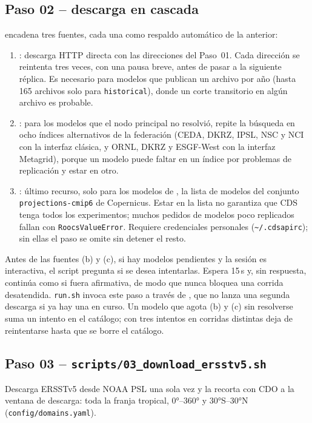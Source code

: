 \subsection{Paso 02 -- descarga en cascada}
 encadena tres fuentes, cada una como respaldo automático de la anterior:
\begin{enumerate}[label=(\alph*)]
\item {}: descarga HTTP directa con las direcciones del Paso~01. Cada dirección se reintenta tres veces, con una pausa breve, antes de pasar a la siguiente réplica. Es necesario para modelos que publican un archivo por año (hasta 165 archivos solo para \texttt{historical}), donde un corte transitorio en algún archivo es probable.
\item {}: para los modelos que el nodo principal no resolvió, repite la búsqueda en ocho índices alternativos de la federación (CEDA, DKRZ, IPSL, NSC y NCI con la interfaz clásica, y ORNL, DKRZ y ESGF-West con la interfaz Metagrid), porque un modelo puede faltar en un índice por problemas de replicación y estar en otro.
\item {}: último recurso, solo para los modelos de , la lista de modelos del conjunto \texttt{projections-cmip6} de Copernicus. Estar en la lista no garantiza que CDS tenga todos los experimentos; muchos pedidos de modelos poco replicados fallan con \texttt{RoocsValueError}. Requiere credenciales personales (\texttt{\textasciitilde/.cdsapirc}); sin ellas el paso se omite sin detener el resto.
\end{enumerate}
Antes de las fuentes (b) y (c), si hay modelos pendientes y la sesión es interactiva, el script pregunta si se desea intentarlas. Espera 15\,s y, sin respuesta, continúa como si fuera afirmativa, de modo que nunca bloquea una corrida desatendida. \texttt{run.sh} invoca este paso a través de , que no lanza una segunda descarga si ya hay una en curso. Un modelo que agota (b) y (c) sin resolverse suma un intento en el catálogo; con tres intentos en corridas distintas deja de reintentarse hasta que se borre el catálogo.

\subsection{Paso 03 -- \texttt{scripts/03\_download\_ersstv5.sh}}
Descarga ERSSTv5 desde NOAA PSL una sola vez y la recorta con CDO a la ventana de descarga: toda la franja tropical, 0°--360° y 30°S--30°N (\texttt{config/domains.yaml}).

